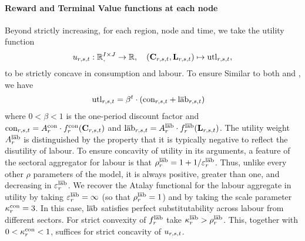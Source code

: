 \documentclass[12pt,a4paper,twoside, draft]{article}
\begin{document}
\paragraph{Reward and Terminal Value functions at each node}
Beyond strictly increasing, for each region, node and time, we take the utility
function
\[
u_{r, \node, t}: \nnreal^{I \times J} \rightarrow \R, \quad
  (\mathbf{C}_{r, \node, t}, \mathbf{L}_{r, \node, t})
    \mapsto \textup{utl}_{r, \node, t},
\]
 to be strictly concave in consumption and labour.
To ensure 
Similar to both \citet{Atalay-Sectoral_shocks} and \citet{CJ}, we have
\begin{align*}
  \textup{utl}_{r, {s}, t}
    &= \beta^{t}
      \cdot \left(
        \textup{c}\textup{o}\textup{n}_{r, {s}, t} + \textup{l}\overline{\textup{a}}\textup{b}_{r, {s}, t}
      \right)
\end{align*}
where $0 < \beta < 1$ is the one-period discount factor and $\textup{c}\textup{o}\textup{n}_{r, {s}, t}
  = A_{r}^{\textup{c}\textup{o}\textup{n}} \cdot f_{r}^{\textup{c}\textup{o}\textup{n}}(\mathbf{C}_{r, {s}, t})$
and $\textup{l}\overline{\textup{a}}\textup{b}_{r, {s}, t}
  = A_{r}^{\textup{l}\overline{\textup{a}}\textup{b}} \cdot f_{r}^{\textup{l}\overline{\textup{a}}\textup{b}}(\mathbf{L}_{r, {s}, t})$.
The utility weight $A_{r}^{{\textup{l}\overline{\textup{a}}\textup{b}}}$ is distinguished by the property that
it is typically negative to reflect the disutility of labour.
To ensure concavity of utility in its arguments, a feature of the sectoral
aggregator for labour is that 
$\rho_{r}^{{\textup{l}\overline{\textup{a}}\textup{b}}} = 1 + 1 / \varepsilon_{r}^{{\textup{l}\overline{\textup{a}}\textup{b}}}$.
Thus, unlike every other $\rho$ parameters of the model, it is always
positive, greater than one, and decreasing in $\varepsilon_{r}^{\textup{l}\overline{\textup{a}}\textup{b}}$.
We recover the Atalay functional for the labour aggregate in utility by taking
$\varepsilon_{r}^{\textup{l}\overline{\textup{a}}\textup{b}} = \infty$ (so that $\rho_{r}^{\textup{l}\overline{\textup{a}}\textup{b}} = 1$) and by taking
the scale parameter $\kappa_{r}^{\textup{c}\textup{o}\textup{n}} = 3$.
In this case, $\textup{l}\overline{\textup{a}}\textup{b}$ satisfies perfect substitutability across labour from
different sectors.
For strict convexity of $f_{r}^{\textup{l}\overline{\textup{a}}\textup{b}}$ take
$\kappa_{r}^{\textup{l}\overline{\textup{a}}\textup{b}} > \rho_{r}^{\textup{l}\overline{\textup{a}}\textup{b}}$.
This, together with $0 <\kappa_{r}^{\textup{c}\textup{o}\textup{n}} < 1$, suffices for strict
concavity of $u_{r, {s}, t}$.
\end{document}
